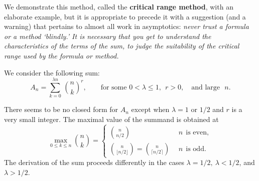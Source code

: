 \documentclass[11pt]{article}
\begin{document}
We demonstrate this method, called the {\bf critical range method},
with an elaborate example, but it is appropriate to precede it with a
suggestion (and a warning) that pertains to almost all work in
asymptotics: \textsl{never trust a formula or a method `blindly.' It is
necessary that you get to understand the characteristics of the terms of
the sum, to judge the suitability of the critical range used by the
formula or method.}

We consider the following sum: 
\begin{equation}\label{E112.23}
A_n = \sum_{k=0}^{\lambda n} \,\binom{n}{k}^r,\qquad \mbox{for some  }
0< \lambda \leq 1,~~r>0, \mbox{~~~and large~~} n .
\end{equation}

There seems to be no closed form for $A_n$ except when $\lambda =1$ or $1/2$
and $r$ is a very small integer.
The maximal value of the summand is obtained at
\[
\max_{0\le k\le n} \binom{n}{k} = \left\{ 
\begin{array}{cl}
\binom{n}{n/2} & \ \ n \ \ \mbox{is even}, \\
\binom{n}{\lfloor n/2 \rfloor } = \binom{n}{\lceil n/2 \rceil }& \ \
n \ \ \mbox{is odd} . 
\end{array}
\right. 
\]
The derivation of the sum proceeds differently in the cases $\lambda = 1/2, \
\lambda <1/2$, and $\lambda >1/2$. 
\end{document}
